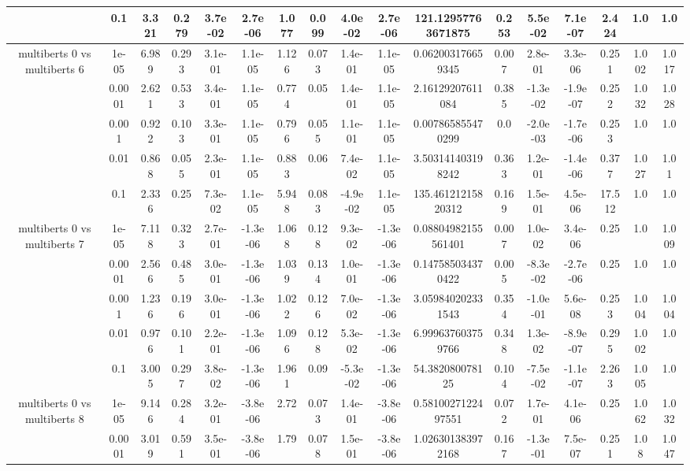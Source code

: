 \begin{tabular}{|c|c|c|c|c|c|c|c|c|c|c|c|c|c|c|c|c|}
 & 0.1 & 3.321 & 0.279 & 3.7e-02 & 2.7e-06 & 1.077 & 0.099 & 4.0e-02 & 2.7e-06 & 121.12957763671875 & 0.253 & 5.5e-02 & 7.1e-07 & 2.424 & 1.0 & 1.0 \\
\hline
\multirow{5}{*}{multiberts 0 vs multiberts 6} & 1e-05 & 6.989 & 0.293 & 3.1e-01 & 1.1e-05 & 1.126 & 0.073 & 1.4e-01 & 1.1e-05 & 0.062003176659345 & 0.007 & 2.8e-01 & 3.3e-06 & 0.251 & 1.002 & 1.017 \\
 & 0.0001 & 2.621 & 0.533 & 3.4e-01 & 1.1e-05 & 0.774 & 0.05 & 1.4e-01 & 1.1e-05 & 2.16129207611084 & 0.385 & -1.3e-02 & -1.9e-07 & 0.252 & 1.032 & 1.028 \\
 & 0.001 & 0.922 & 0.103 & 3.3e-01 & 1.1e-05 & 0.796 & 0.055 & 1.1e-01 & 1.1e-05 & 0.007865855470299 & 0.0 & -2.0e-03 & -1.7e-06 & 0.253 & 1.0 & 1.0 \\
 & 0.01 & 0.868 & 0.055 & 2.3e-01 & 1.1e-05 & 0.883 & 0.06 & 7.4e-02 & 1.1e-05 & 3.503141403198242 & 0.363 & 1.2e-01 & -1.4e-06 & 0.377 & 1.027 & 1.01 \\
 & 0.1 & 2.336 & 0.25 & 7.3e-02 & 1.1e-05 & 5.948 & 0.083 & -4.9e-02 & 1.1e-05 & 135.46121215820312 & 0.169 & 1.5e-01 & 4.5e-06 & 17.512 & 1.0 & 1.0 \\
\hline
\multirow{5}{*}{multiberts 0 vs multiberts 7} & 1e-05 & 7.118 & 0.323 & 2.7e-01 & -1.3e-06 & 1.068 & 0.128 & 9.3e-02 & -1.3e-06 & 0.08804982155561401 & 0.007 & 1.0e-02 & 3.4e-06 & 0.25 & 1.0 & 1.009 \\
 & 0.0001 & 2.566 & 0.485 & 3.0e-01 & -1.3e-06 & 1.039 & 0.134 & 1.0e-01 & -1.3e-06 & 0.147585034370422 & 0.005 & -8.3e-02 & -2.7e-06 & 0.25 & 1.0 & 1.0 \\
 & 0.001 & 1.236 & 0.196 & 3.0e-01 & -1.3e-06 & 1.022 & 0.126 & 7.0e-02 & -1.3e-06 & 3.059840202331543 & 0.354 & -1.0e-01 & 5.6e-08 & 0.253 & 1.004 & 1.004 \\
 & 0.01 & 0.976 & 0.101 & 2.2e-01 & -1.3e-06 & 1.096 & 0.128 & 5.3e-02 & -1.3e-06 & 6.999637603759766 & 0.348 & 1.3e-02 & -8.9e-07 & 0.295 & 1.002 & 1.0 \\
 & 0.1 & 3.005 & 0.297 & 3.8e-02 & -1.3e-06 & 1.961 & 0.09 & -5.3e-02 & -1.3e-06 & 54.382080078125 & 0.104 & -7.5e-02 & -1.1e-07 & 2.263 & 1.005 & 1.0 \\
\hline
\multirow{5}{*}{multiberts 0 vs multiberts 8} & 1e-05 & 9.146 & 0.284 & 3.2e-01 & -3.8e-06 & 2.72 & 0.073 & 1.4e-01 & -3.8e-06 & 0.5810027122497551 & 0.072 & 1.7e-01 & 4.1e-06 & 0.25 & 1.062 & 1.032 \\
 & 0.0001 & 3.019 & 0.591 & 3.5e-01 & -3.8e-06 & 1.79 & 0.078 & 1.5e-01 & -3.8e-06 & 1.026301383972168 & 0.167 & -1.3e-01 & 7.5e-07 & 0.251 & 1.08 & 1.047 \\

\end{tabular}
